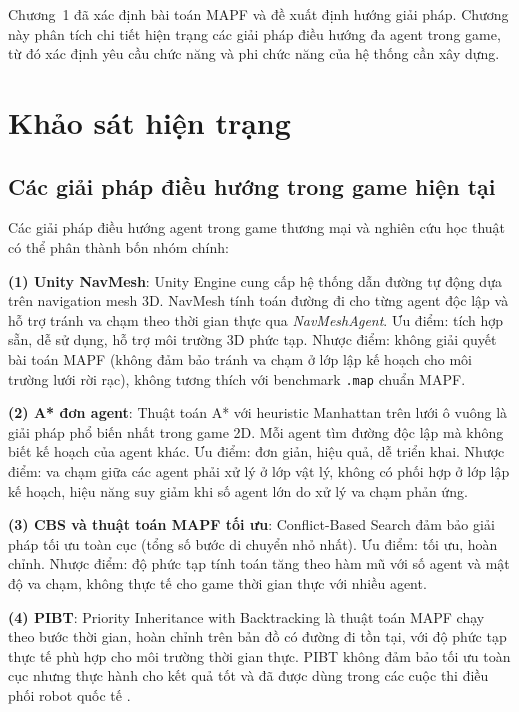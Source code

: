 \documentclass[../DoAn.tex]{subfiles}
\begin{document}
Chương~1 đã xác định bài toán MAPF và đề xuất định hướng giải pháp. Chương này phân
tích chi tiết hiện trạng các giải pháp điều hướng đa agent trong game, từ đó xác định
yêu cầu chức năng và phi chức năng của hệ thống cần xây dựng.

\section{Khảo sát hiện trạng}
\label{section:2.1}

\subsection{Các giải pháp điều hướng trong game hiện tại}

Các giải pháp điều hướng agent trong game thương mại và nghiên cứu học thuật có thể
phân thành bốn nhóm chính:

\textbf{(1) Unity NavMesh}: Unity Engine cung cấp hệ thống dẫn đường tự động dựa trên
navigation mesh 3D. NavMesh tính toán đường đi cho từng agent độc lập và hỗ trợ tránh
va chạm theo thời gian thực qua \textit{NavMeshAgent}. Ưu điểm: tích hợp sẵn, dễ sử
dụng, hỗ trợ môi trường 3D phức tạp. Nhược điểm: không giải quyết bài toán MAPF (không
đảm bảo tránh va chạm ở lớp lập kế hoạch cho môi trường lưới rời rạc), không tương
thích với benchmark \texttt{.map} chuẩn MAPF.

\textbf{(2) A* đơn agent}: Thuật toán A* \cite{hart1968astar} với heuristic Manhattan
trên lưới ô vuông là giải pháp phổ biến nhất trong game 2D. Mỗi agent tìm đường độc
lập mà không biết kế hoạch của agent khác. Ưu điểm: đơn giản, hiệu quả, dễ triển khai.
Nhược điểm: va chạm giữa các agent phải xử lý ở lớp vật lý, không có phối hợp ở lớp
lập kế hoạch, hiệu năng suy giảm khi số agent lớn do xử lý va chạm phản ứng.

\textbf{(3) CBS và thuật toán MAPF tối ưu}: Conflict-Based Search \cite{sharon2015cbs}
đảm bảo giải pháp tối ưu toàn cục (tổng số bước di chuyển nhỏ nhất). Ưu điểm: tối ưu,
hoàn chỉnh. Nhược điểm: độ phức tạp tính toán tăng theo hàm mũ với số agent và mật độ
va chạm, không thực tế cho game thời gian thực với nhiều agent.

\textbf{(4) PIBT}: Priority Inheritance with Backtracking \cite{okumura2022pibt} là thuật
toán MAPF chạy theo bước thời gian, hoàn chỉnh trên bản đồ có đường đi tồn tại, với
độ phức tạp thực tế phù hợp cho môi trường thời gian thực. PIBT không đảm bảo tối ưu
toàn cục nhưng thực hành cho kết quả tốt và đã được dùng trong các cuộc thi điều phối robot
quốc tế \cite{lorr2024}.
\end{document}
